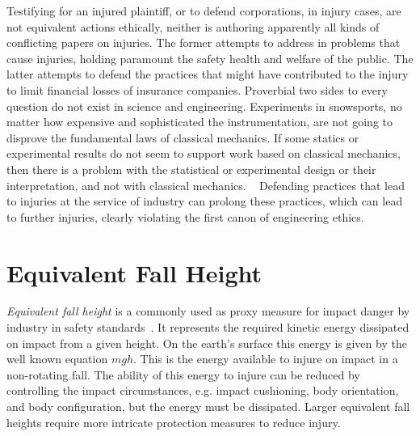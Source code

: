 \documentclass{article}
\begin{document}
Testifying for an injured plaintiff, or to defend corporations, in injury
cases, are not equivalent actions ethically, neither is authoring apparently
all kinds of conflicting papers on injuries. The former attempts to address in
problems that cause injuries, holding paramount the safety health and welfare
of the public. The latter attempts to defend the practices that might have
contributed to the injury to limit financial losses of insurance companies.
Proverbial two sides to every question do not exist in science and engineering.
Experiments in snowsports, no matter how expensive and sophisticated the
instrumentation, are not going to disprove the fundamental laws of classical
mechanics. If some statics or experimental results do not seem to support work
based on classical mechanics, then there is a problem with the statistical or
experimental design or their interpretation, and not with classical mechanics.
~ Defending practices that lead to injuries at the
service of industry can prolong these practices, which can lead to further
injuries, clearly violating the first canon of engineering ethics.

\section{Equivalent Fall Height}
%
\emph{Equivalent fall height} is a commonly used as proxy measure for impact
danger by industry in safety standards~\cite{Hubbard2012}. It represents the
required kinetic energy dissipated on impact from a given height. On the
earth's surface this energy is given by the well known equation $mgh$. This is
the energy available to injure on impact in a non-rotating fall. The ability of
this energy to injure can be reduced by controlling the impact circumstances,
e.g. impact cushioning, body orientation, and body configuration, but the
energy must be dissipated. Larger equivalent fall heights require more
intricate protection measures to reduce injury.
\end{document}
